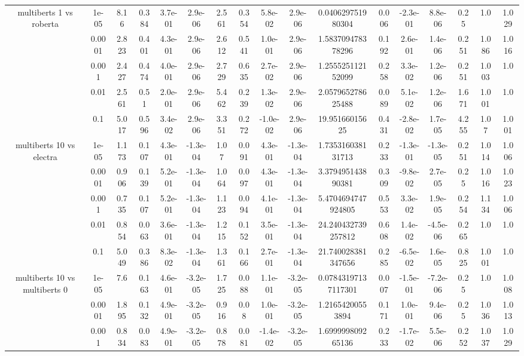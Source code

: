\begin{tabular}{|c|c|c|c|c|c|c|c|c|c|c|c|c|c|c|c|c|}
\hline
\multirow{5}{*}{multiberts 1 vs roberta } & 1e-05 & 8.16 & 0.384 & 3.7e-01 & 2.9e-06 & 2.561 & 0.354 & 5.8e-02 & 2.9e-06 & 0.040629751980304 & 0.006 & -2.3e-01 & 8.8e-06 & 0.25 & 1.0 & 1.029 \\
 & 0.0001 & 2.823 & 0.401 & 4.3e-01 & 2.9e-06 & 2.612 & 0.541 & 1.0e-01 & 2.9e-06 & 1.583709478378296 & 0.192 & 2.6e-01 & 1.4e-06 & 0.251 & 1.086 & 1.016 \\
 & 0.001 & 2.427 & 0.474 & 4.0e-01 & 2.9e-06 & 2.729 & 0.635 & 2.7e-02 & 2.9e-06 & 1.255525112152099 & 0.258 & 3.3e-02 & 1.2e-06 & 0.251 & 1.003 & 1.0 \\
 & 0.01 & 2.561 & 0.51 & 2.0e-01 & 2.9e-06 & 5.462 & 0.239 & 1.3e-02 & 2.9e-06 & 2.057965278625488 & 0.089 & 5.1e-02 & 1.2e-06 & 1.671 & 1.001 & 1.0 \\
 & 0.1 & 5.017 & 0.596 & 3.4e-02 & 2.9e-06 & 3.351 & 0.272 & -1.0e-02 & 2.9e-06 & 19.95166015625 & 0.431 & -2.8e-02 & 1.7e-05 & 4.255 & 1.07 & 1.001 \\
\hline
\multirow{5}{*}{multiberts 10 vs electra } & 1e-05 & 1.173 & 0.107 & 4.3e-01 & -1.3e-04 & 1.07 & 0.091 & 4.3e-01 & -1.3e-04 & 1.735316038131713 & 0.233 & -1.3e-01 & -1.3e-05 & 0.251 & 1.014 & 1.006 \\
 & 0.0001 & 0.906 & 0.139 & 5.2e-01 & -1.3e-04 & 1.064 & 0.097 & 4.3e-01 & -1.3e-04 & 3.379495143890381 & 0.309 & -9.8e-02 & 2.7e-05 & 0.25 & 1.016 & 1.023 \\
 & 0.001 & 0.735 & 0.107 & 5.2e-01 & -1.3e-04 & 1.123 & 0.094 & 4.1e-01 & -1.3e-04 & 5.4704694747924805 & 0.553 & 3.3e-02 & 1.9e-05 & 0.254 & 1.134 & 1.006 \\
 & 0.01 & 0.854 & 0.063 & 3.6e-01 & -1.3e-04 & 1.215 & 0.152 & 3.5e-01 & -1.3e-04 & 24.240432739257812 & 0.608 & 1.4e-02 & -4.5e-06 & 0.265 & 1.0 & 1.0 \\
 & 0.1 & 5.049 & 0.386 & 8.3e-02 & -1.3e-04 & 1.361 & 0.166 & 2.7e-01 & -1.3e-04 & 21.740028381347656 & 0.285 & -6.5e-02 & 1.6e-05 & 0.825 & 1.001 & 1.0 \\
\hline
\multirow{5}{*}{multiberts 10 vs multiberts 0} & 1e-05 & 7.6 & 0.163 & 4.6e-01 & -3.2e-05 & 1.725 & 0.088 & 1.1e-01 & -3.2e-05 & 0.07843197137117301 & 0.007 & -1.5e-01 & -7.2e-06 & 0.25 & 1.0 & 1.008 \\
 & 0.0001 & 1.895 & 0.132 & 4.9e-01 & -3.2e-05 & 0.916 & 0.08 & 1.0e-01 & -3.2e-05 & 1.21654200553894 & 0.171 & 1.0e-01 & 9.4e-06 & 0.25 & 1.036 & 1.013 \\
 & 0.001 & 0.834 & 0.083 & 4.9e-01 & -3.2e-05 & 0.878 & 0.081 & -1.4e-02 & -3.2e-05 & 1.699999809265136 & 0.233 & -1.7e-02 & 5.5e-06 & 0.252 & 1.037 & 1.029 \\

\end{tabular}
